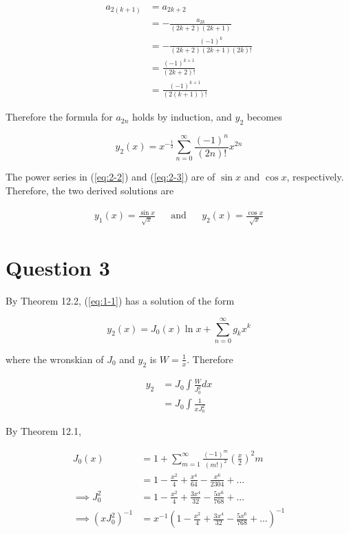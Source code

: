 \documentclass{article}
\begin{document}
\begin{align*}
    a_{2(k + 1)} &= a_{2k + 2}\\
    &= -\frac{a_{2k}}{(2k + 2)(2k + 1)}\\
    &=  -\frac{(-1)^{k}}{(2k + 2)(2k + 1)(2k)!}\\
    &= \frac{(-1)^{k + 1}}{(2k + 2)!}\\
    &= \frac{(-1)^{k + 1}}{(2(k + 1))!}
\end{align*}

Therefore the formula for $a_{2n}$ holds by induction, and $y_2$ becomes

\begin{equation} \label{eq:2-3}
    y_2(x) = x^{-\frac{1}{2}} \sum_{n = 0}^\infty \frac{(-1)^n}{(2n)!} x^{2n}
\end{equation}

The power series in (\ref{eq:2-2}) and (\ref{eq:2-3}) are of $\sin x$ and $\cos x$,
respectively. Therefore, the two derived solutions are

\begin{align*}
    y_1(x) = \frac{\sin x}{\sqrt{x}} && \text{and} && y_2(x) = \frac{\cos x}{\sqrt{x}}
\end{align*}

\section*{Question 3}

By Theorem 12.2, (\ref{eq:1-1}) has a solution of the form

\begin{equation} \label{eq:3-1}
    y_2(x) = J_0(x)\ln x + \sum_{n = 0}^\infty g_k x^k
\end{equation}

where the wronskian of $J_0$ and $y_2$ is $W = \frac{1}{x}$. Therefore

\begin{align*}
    y_2 &= J_0 \int \frac{W}{J_0^2} dx\\
    &= J_0 \int \frac{1}{xJ_0^2}
\end{align*}

By Theorem 12.1,

\begin{align*}
    J_0(x) &= 1 + \sum_{m = 1}^\infty \frac{(-1)^m}{(m!)^2} \left(\frac{x}{2}\right)^2m\\
    &= 1 - \frac{x^2}{4} + \frac{x^4}{64} - \frac{x^6}{2304} + ...\\
    \implies J_0^2 &= 1 - \frac{x^2}{4} + \frac{3x^4}{32} - \frac{5x^6}{768} + ...\\
    \implies (xJ_0^2)^{-1} &= x^{-1}\left(1 - \frac{x^2}{4} + \frac{3x^4}{32} - \frac{5x^6}{768} + ...\right)^{-1}
\end{align*}
\end{document}
